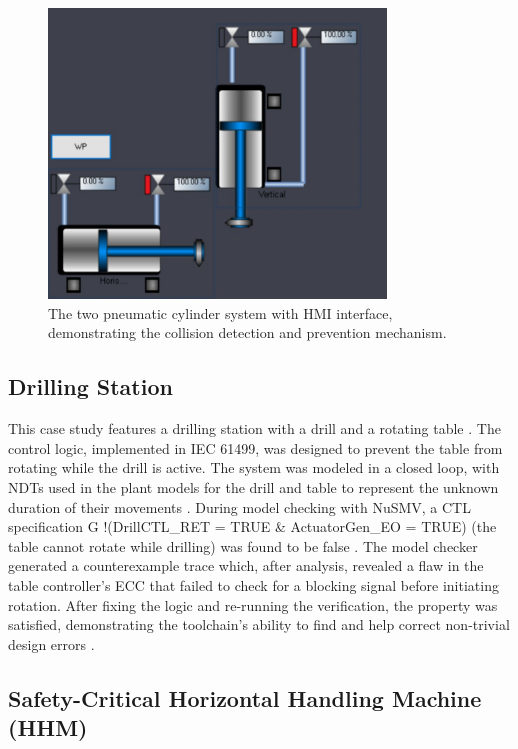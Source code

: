 \begin{figure}[h]
\centering
\includegraphics[width=0.8\textwidth]{chapters/images/chapter2/2cylindre_hmi.JPG}
\caption{The two pneumatic cylinder system with HMI interface, demonstrating the collision detection and prevention mechanism.}
\label{fig:two_cylinders}
\end{figure}

\subsection{Drilling Station}

This case study features a drilling station with a drill and a rotating table . The control logic, implemented in IEC 61499, was designed to prevent the table from rotating while the drill is active. The system was modeled in a closed loop, with NDTs used in the plant models for the drill and table to represent the unknown duration of their movements . During model checking with NuSMV, a CTL specification G !(DrillCTL\_RET = TRUE \& ActuatorGen\_EO = TRUE) (the table cannot rotate while drilling) was found to be false . The model checker generated a counterexample trace which, after analysis, revealed a flaw in the table controller's ECC that failed to check for a blocking signal before initiating rotation. After fixing the logic and re-running the verification, the property was satisfied, demonstrating the toolchain's ability to find and help correct non-trivial design errors .

\subsection{Safety-Critical Horizontal Handling Machine (HHM)}

